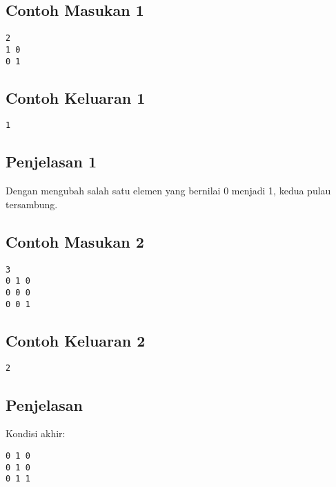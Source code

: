 \documentclass{article}
\begin{document}
\linebreak
\begin{multicols}{2}
\subsection*{Contoh Masukan 1}
\begin{lstlisting}
2
1 0
0 1
\end{lstlisting}
\columnbreak
\subsection*{Contoh Keluaran 1}
\begin{lstlisting}
1
\end{lstlisting}
\vfill
\end{multicols}

\subsection*{Penjelasan 1}
Dengan mengubah salah satu elemen yang bernilai 0 menjadi 1, kedua pulau tersambung.

\linebreak
\begin{multicols}{2}
\subsection*{Contoh Masukan 2}
\begin{lstlisting}
3
0 1 0
0 0 0
0 0 1
\end{lstlisting}
\columnbreak
\subsection*{Contoh Keluaran 2}
\begin{lstlisting}
2
\end{lstlisting}
\vfill
\end{multicols}

\subsection*{Penjelasan}
Kondisi akhir:
\begin{lstlisting}
0 1 0
0 1 0
0 1 1
\end{lstlisting}
\end{document}

